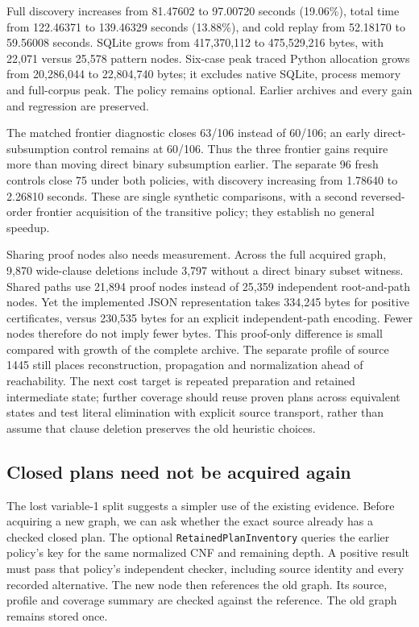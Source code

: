 \documentclass[11pt,a4paper]{article}
\numberwithin{equation}{section}
\theoremstyle{plain}
\theoremstyle{definition}
\theoremstyle{remark}
\begin{document}
Full discovery increases from 81.47602 to 97.00720 seconds (19.06\%), total time from 122.46371 to 139.46329 seconds (13.88\%), and cold replay from 52.18170 to 59.56008 seconds. SQLite grows from 417,370,112 to 475,529,216 bytes, with 22,071 versus 25,578 pattern nodes. Six-case peak traced Python allocation grows from 20,286,044 to 22,804,740 bytes; it excludes native SQLite, process memory and full-corpus peak. The policy remains optional. Earlier archives and every gain and regression are preserved.

The matched frontier diagnostic closes 63/106 instead of 60/106; an early direct-subsumption control remains at 60/106. Thus the three frontier gains require more than moving direct binary subsumption earlier. The separate 96 fresh controls close 75 under both policies, with discovery increasing from 1.78640 to 2.26810 seconds. These are single synthetic comparisons, with a second reversed-order frontier acquisition of the transitive policy; they establish no general speedup.

Sharing proof nodes also needs measurement. Across the full acquired graph, 9,870 wide-clause deletions include 3,797 without a direct binary subset witness. Shared paths use 21,894 proof nodes instead of 25,359 independent root-and-path nodes. Yet the implemented JSON representation takes 334,245 bytes for positive certificates, versus 230,535 bytes for an explicit independent-path encoding. Fewer nodes therefore do not imply fewer bytes. This proof-only difference is small compared with growth of the complete archive. The separate profile of source 1445 still places reconstruction, propagation and normalization ahead of reachability. The next cost target is repeated preparation and retained intermediate state; further coverage should reuse proven plans across equivalent states and test literal elimination with explicit source transport, rather than assume that clause deletion preserves the old heuristic choices.

\subsection{Closed plans need not be acquired again}
\label{sec:retained-plans}

The lost variable-1 split suggests a simpler use of the existing evidence. Before acquiring a new graph, we can ask whether the exact source already has a checked closed plan. The optional \texttt{RetainedPlanInventory} queries the earlier policy's key for the same normalized CNF and remaining depth. A positive result must pass that policy's independent checker, including source identity and every recorded alternative. The new node then references the old graph. Its source, profile and coverage summary are checked against the reference. The old graph remains stored once.
\end{document}
